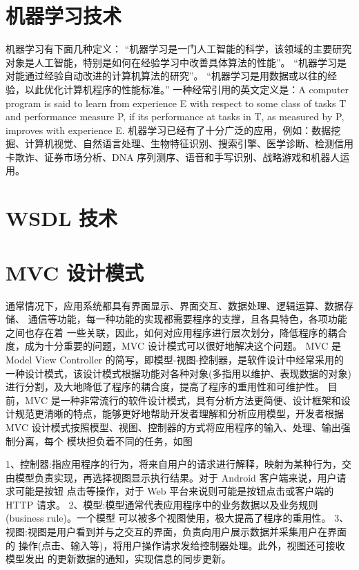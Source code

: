 \documentclass[doctor,secret]{thuthesis}
\begin{document}
\section{机器学习技术}
\label{sec:orgf913073}
机器学习有下面几种定义： “机器学习是一门人工智能的科学，该领域的主要研究对象是人工智能，特别是如何在经验学习中改善具体算法的性能”\cite{enbom_should_2013}。 “机器学习是对能通过经验自动改进的计算机算法的研究”。 “机器学习是用数据或以往的经验，以此优化计算机程序的性能标准。” 一种经常引用的英文定义是：A computer program is said to learn from experience E with respect to some class of tasks T and performance measure P, if its performance at tasks in T, as measured by P, improves with experience E. 
机器学习已经有了十分广泛的应用，例如：数据挖掘、计算机视觉、自然语言处理、生物特征识别、搜索引擎、医学诊断、检测信用卡欺诈、证券市场分析、DNA 序列测序、语音和手写识别、战略游戏和机器人运用。\cite{tierney-gumaer_review_2006} 
\section{WSDL 技术}
\label{sec:orgf68e295}
\section{MVC 设计模式}
\label{sec:orgb1420c7}
通常情况下，应用系统都具有界面显示、界面交互、数据处理、逻辑运算、数据存储、 通信等功能，每一种功能的实现都需要程序的支撑，且各具特色，各项功能之间也存在着 一些关联，因此，如何对应用程序进行层次划分，降低程序的耦合度，成为十分重要的问题，MVC 设计模式可以很好地解决这个问题。
MVC 是 Model View Controller 的简写，即模型-视图-控制器，是软件设计中经常采用的一种设计模式，该设计模式根据功能对各种对象(多指用以维护、表现数据的对象) 进行分割，及大地降低了程序的耦合度，提高了程序的重用性和可维护性。
目前，MVC 是一种非常流行的软件设计模式，具有分析方法更简便、设计框架和设计规范更清晰的特点，能够更好地帮助开发者理解和分析应用模型，开发者根据 MVC 设计模式按照模型、视图、控制器的方式将应用程序的输入、处理、输出强制分离，每个 模块担负着不同的任务，如图

1、控制器:指应用程序的行为，将来自用户的请求进行解释，映射为某种行为，交由模型负责实现，再选择视图显示执行结果。对于 Android 客户端来说，用户请求可能是按钮 点击等操作，对于 Web 平台来说则可能是按钮点击或客户端的 HTTP 请求。
2、模型:模型通常代表应用程序中的业务数据以及业务规则(business rule)。一个模型 可以被多个视图使用，极大提高了程序的重用性。
3、视图:视图是用户看到并与之交互的界面，负责向用户展示数据并采集用户在界面的 操作(点击、输入等)，将用户操作请求发给控制器处理。此外，视图还可接收模型发出 的更新数据的通知，实现信息的同步更新。
\end{document}
